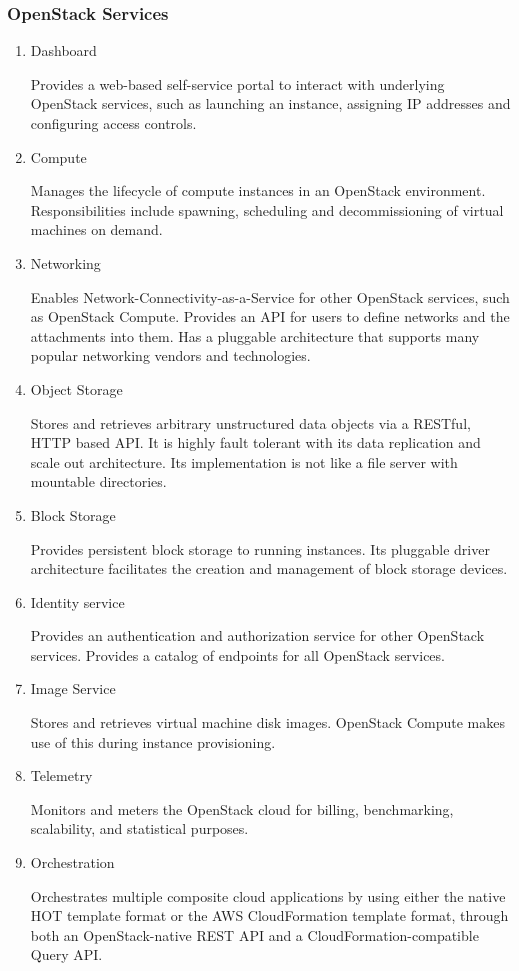      \subsubsection{OpenStack Services}
     \begin{enumerate}
         \item Dashboard 
         \par
         Provides a web-based self-service portal to interact with underlying OpenStack services, such as launching an instance, assigning IP addresses and configuring access controls.%
         \item Compute 
         \par
         Manages the lifecycle of compute instances in an OpenStack environment. Responsibilities include spawning, scheduling and decommissioning of virtual machines on demand.%
         \item Networking
         \par
         Enables Network-Connectivity-as-a-Service for other OpenStack services, such as OpenStack Compute. Provides an API for users to define networks and the attachments into them. Has a pluggable architecture that supports many popular networking vendors and technologies.%
         \item Object Storage
         \par
         Stores and retrieves arbitrary unstructured data objects via a RESTful, HTTP based API. It is highly fault tolerant with its data replication and scale out architecture. Its implementation is not like a file server with mountable directories.%
         \item Block Storage
         \par
         Provides persistent block storage to running instances. Its pluggable driver architecture facilitates the creation and management of block storage devices.%
         \item Identity service
         \par
         Provides an authentication and authorization service for other OpenStack services. Provides a catalog of endpoints for all OpenStack services.%
         \item Image Service 
         \par
         Stores and retrieves virtual machine disk images. OpenStack Compute makes use of this during instance provisioning.%
         \item Telemetry 
         \par
         Monitors and meters the OpenStack cloud for billing, benchmarking, scalability, and statistical purposes.%
         \item Orchestration 
         \par
         Orchestrates multiple composite cloud applications by using either the native HOT template format or the AWS CloudFormation template format, through both an OpenStack-native REST API and a CloudFormation-compatible Query API.%
     \end{enumerate}
     